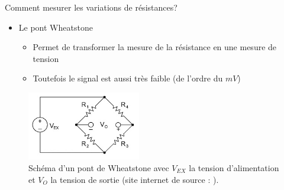 \documentclass{beamer}
\begin{document}
\begin{frame}
\begin{block}{Comment mesurer les variations de résistances?}
\begin{itemize}
\item Le pont Wheatstone
\begin{itemize}
\item Permet de transformer la mesure de la résistance en une mesure de tension
\item Toutefois le signal est aussi très faible (de l'ordre du $mV$)
\end{itemize}
\end{itemize}

\begin{figure}
\begin{center}
\includegraphics[height=3cm]{images/wheatstone_bridge.jpg}
\end{center}
\caption{Schéma d'un pont de Wheatstone avec $V_{EX}$ la tension d'alimentation et $V_O$ la tension de sortie (site internet de source : \cite{wheatstone}).}
\label{fig:wheatstone_bridge}
\end{figure}
\end{block}
\end{frame}
\end{document}
